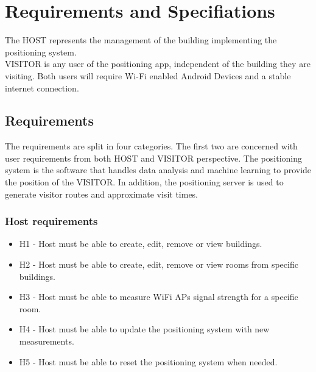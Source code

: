 \chapter{Requirements and Specifiations}
\noindent The HOST represents the management of the building implementing the positioning system.\\ 
VISITOR is any user of the positioning app, independent of the building they are visiting.
Both users will require Wi-Fi enabled Android Devices and a stable internet connection.

\section{Requirements}
The requirements are split in four categories. The first two are concerned with user requirements from both HOST and VISITOR perspective. The positioning system is the software that handles data analysis and machine learning to provide the position of the VISITOR. In addition, the positioning server is used to generate visitor routes and approximate visit times.

\subsection{Host requirements}
	\begin{itemize}
		\item H1 - Host must be able to create, edit, remove or view buildings.
		\item H2 - Host must be able to create, edit, remove or view rooms from specific buildings.
		\item H3 - Host must be able to measure WiFi APs signal strength for a specific room.
		\item H4 - Host must be able to update the positioning system with new measurements.
		\item H5 - Host must be able to reset the positioning system when needed.
	\end{itemize}

